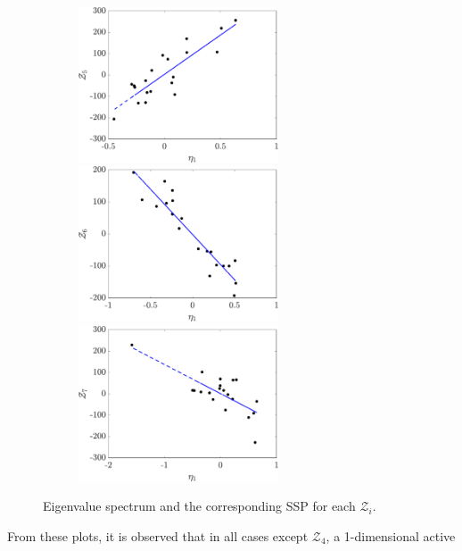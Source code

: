 \begin{figure}[htbp]
\begin{center}
\begin{subfigure}{0.35\textwidth}
\\
\includegraphics[width=0.65\textwidth]{./Figures/SSP_Zf5} 
\\
\includegraphics[width=0.65\textwidth]{./Figures/SSP_Zf6} 
\\
\includegraphics[width=0.65\textwidth]{./Figures/SSP_Zf7} 
\end{subfigure}
\end{center}
\caption{Eigenvalue spectrum and the corresponding SSP for each $\mathcal{Z}_i$.}
\label{fig:as}
\end{figure}
%
From these plots, it is observed that in all cases except $\mathcal{Z}_4$, a 1-dimensional active
